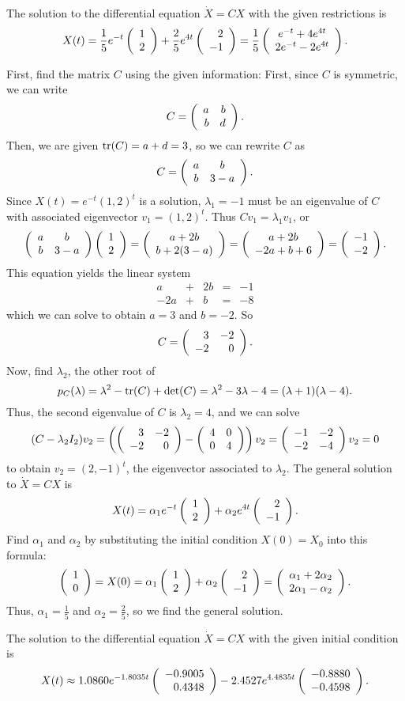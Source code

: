 \documentclass{ximera}
\begin{document}
 \ans The solution to the differential equation $\dot{X} =
CX$ with the given restrictions is
\[
X(t) = \frac{1}{5}e^{-t}\left(\begin{array}{r} 1 \\ 2\end{array}\right) + \frac{2}{5}e^{4t}\left(\begin{array}{r} 2 \\ -1\end{array}\right)
= \frac{1}{5}\left(\begin{array}{c} e^{-t} + 4e^{4t} \\ 2e^{-t} - 2e^{4t}\end{array}\right).
\]

\soln First, find the matrix $C$ using the given information:
First, since $C$ is symmetric, we can write
\[
C = \left(\begin{array}{rr} a & b\\ b &d\end{array}\right).
\]
Then, we are given ${\rm tr}(C) = a + d = 3$, so we can rewrite $C$ as
\[
C = \left(\begin{array}{cc} a & b\\ b &3 - a\end{array}\right).
\]
Since $X(t) = e^{-t}(1,2)^t$ is a solution, $\lambda_1 = -1$
must be an eigenvalue of $C$ with associated eigenvector $v_1 = (1,2)^t$.
Thus $Cv_1 = \lambda_1v_1$, or
\[
\left(\begin{array}{cc} a & b\\ b &3 - a\end{array}\right)\left(\begin{array}{r} 1 \\ 2\end{array}\right) = \left(\begin{array}{c} a + 2b \\ b + 2(3 - a)\end{array}\right)
= \left(\begin{array}{c} a + 2b \\ -2a + b + 6\end{array}\right) = \left(\begin{array}{r} -1 \\ -2\end{array}\right).
\]
This equation yields the linear system
\[
\begin{array}{rrrrr}
a & + & 2b & = & -1 \\
-2a & + & b & = & -8
\end{array}
\]
which we can solve to obtain $a = 3$ and $b = -2$.  So
\[
C = \left(\begin{array}{rr} 3 & -2\\ -2 &0\end{array}\right).
\]
Now, find $\lambda_2$, the other root of
\[
p_C(\lambda) = \lambda^2 - {\rm tr}(C) + \det(C) = \lambda^2 - 3\lambda -4
= (\lambda + 1)(\lambda - 4).
\]
Thus, the second eigenvalue of $C$ is $\lambda_2 = 4$, and we can solve
\[
(C - \lambda_2I_2)v_2 = \left(\left(\begin{array}{rr} 3 & -2\\ -2 &0\end{array}\right) - \left(\begin{array}{rr} 4 & 0\\ 0 &4\end{array}\right)
\right)v_2 = \left(\begin{array}{rr} -1 & -2\\ -2 &-4\end{array}\right)v_2 = 0
\]
to obtain $v_2 = (2,-1)^t$, the eigenvector associated to $\lambda_2$.
The general solution to $\dot{X} = CX$ is
\[
X(t) = \alpha_1e^{-t}\left(\begin{array}{r} 1 \\ 2\end{array}\right) + \alpha_2e^{4t}\left(\begin{array}{r} 2 \\ -1\end{array}\right).
\]
Find $\alpha_1$ and $\alpha_2$ by substituting the initial condition $X(0)
= X_0$ into this formula:
\[
\left(\begin{array}{r} 1 \\ 0\end{array}\right) = X(0) = \alpha_1\left(\begin{array}{r} 1 \\ 2\end{array}\right) + \alpha_2\left(\begin{array}{r} 2 \\ -1\end{array}\right)
= \left(\begin{array}{c} \alpha_1 + 2\alpha_2 \\ 2\alpha_1 - \alpha_2\end{array}\right).
\]
Thus, $\alpha_1 = \frac{1}{5}$ and $\alpha_2 = \frac{2}{5}$, so we find
the general solution.

 \ans The solution to the differential equation $\dot{X}
= CX$ with the given initial condition is
\[
X(t) \approx 1.0860e^{-1.8035t}\left(\begin{array}{r} -0.9005 \\  0.4348\end{array}\right)
- 2.4527e^{4.4835t}\left(\begin{array}{r} -0.8880 \\ -0.4598\end{array}\right).
\]
\end{document}

